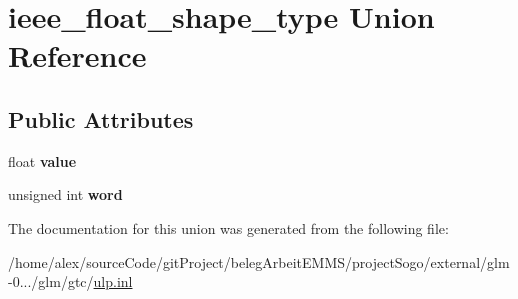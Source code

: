 \hypertarget{unionieee__float__shape__type}{\section{ieee\-\_\-float\-\_\-shape\-\_\-type Union Reference}
\label{unionieee__float__shape__type}
}
\subsection*{Public Attributes}
\begin{DoxyCompactItemize}
\item 
\hypertarget{unionieee__float__shape__type_aa0c47451f1b974421cbb9e2833ddb68e}{float {\bfseries value}}\label{unionieee__float__shape__type_aa0c47451f1b974421cbb9e2833ddb68e}

\item 
\hypertarget{unionieee__float__shape__type_a49230c21acd672d044f38b1abcbd6071}{unsigned int {\bfseries word}}\label{unionieee__float__shape__type_a49230c21acd672d044f38b1abcbd6071}

\end{DoxyCompactItemize}


The documentation for this union was generated from the following file\-:\begin{DoxyCompactItemize}
\item 
/home/alex/source\-Code/git\-Project/beleg\-Arbeit\-E\-M\-M\-S/project\-Sogo/external/glm-\/0.../glm/gtc/\hyperlink{ulp_8inl}{ulp.\-inl}\end{DoxyCompactItemize}

